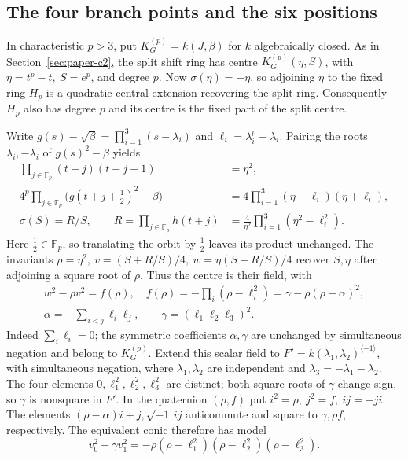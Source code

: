 \documentclass[11pt,a4paper]{article}
\theoremstyle{definition}
\begin{document}
\subsection{The four branch points and the six positions}\label{sec:g2four}
In characteristic \(p>3\), put \(K_G^{(p)}=k(J,\beta)\) for \(k\) algebraically closed.
As in Section~\ref{sec:paper-c2}, the split shift ring has centre \(K_G^{(p)}(\eta,S)\), with \(\eta=t^p-t,\ S=e^p\), and degree \(p\). Now \(\sigma(\eta)=-\eta\), so adjoining \(\eta\) to the fixed ring \(H_p\) is a quadratic central extension recovering the split ring. Consequently \(H_p\) also has degree \(p\) and its centre is the fixed part of the split centre.

Write \(g(s)-\sqrt\beta=\prod_{i=1}^3(s-\lambda_i)\) and \(\ell_i=\lambda_i^p-\lambda_i\). Pairing the roots \(\lambda_i,-\lambda_i\) of \(g(s)^2-\beta\) yields
\[
 \begin{aligned}
 \prod_{j\in\mathbb F_p}(t+j)(t+j+1)&=\eta^2,\\
 4^p\prod_{j\in\mathbb F_p}\big(g(t+j+\tfrac12)^2-\beta\big)
 &=4\prod_{i=1}^3(\eta-\ell_i)(\eta+\ell_i),\\
 \sigma(S)=R/S,\qquad R=\prod_{j\in\mathbb F_p}h(t+j)
 &=\frac{4}{\eta^2}\prod_{i=1}^3(\eta^2-\ell_i^2).
 \end{aligned}
\]
Here \(\tfrac12\in\mathbb F_p\), so translating the orbit by \(\tfrac12\) leaves its product unchanged.
The invariants \(\rho=\eta^2,\ v=(S+R/S)/4,\ w=\eta(S-R/S)/4\) recover \(S,\eta\) after adjoining a square root of \(\rho\). Thus the centre is their field, with
\[
 \begin{gathered}
 w^2-\rho v^2=f(\rho),\quad
 f(\rho)=-\prod_i(\rho-\ell_i^2)=\gamma-\rho(\rho-\alpha)^2,\\
 \alpha=-\sum_{i<j}\ell_i\ell_j,\qquad \gamma=(\ell_1\ell_2\ell_3)^2 .
 \end{gathered}
\]
Indeed \(\sum_i\ell_i=0\); the symmetric coefficients \(\alpha,\gamma\) are unchanged by simultaneous negation and belong to \(K_G^{(p)}\).
Extend this scalar field to \(F'=k(\lambda_1,\lambda_2)^{\langle-1\rangle}\), with simultaneous negation, where \(\lambda_1,\lambda_2\) are independent and \(\lambda_3=-\lambda_1-\lambda_2\). The four elements \(0,\ell_1^2,\ell_2^2,\ell_3^2\) are distinct; both square roots of \(\gamma\) change sign, so \(\gamma\) is nonsquare in \(F'\). In the quaternion \((\rho,f)\) put \(i^2=\rho,\ j^2=f,\ ij=-ji\). The elements \((\rho-\alpha)i+j,\sqrt{-1}\,ij\) anticommute and square to \(\gamma,\rho f\), respectively. The equivalent conic therefore has model
\[
 v_0^2-\gamma v_1^2=-\rho(\rho-\ell_1^2)(\rho-\ell_2^2)(\rho-\ell_3^2).
\]
\end{document}
